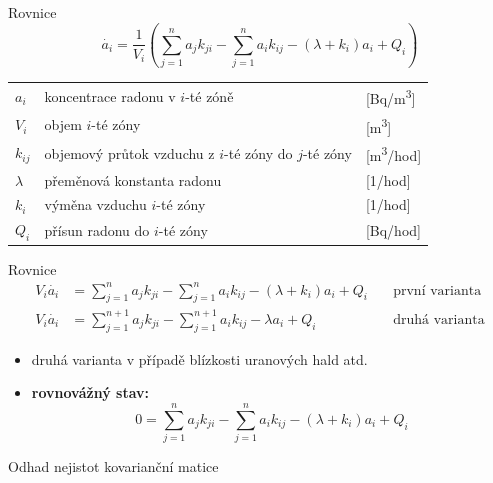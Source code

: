 \documentclass[10pt]{beamer}
\begin{document}
\begin{frame}{Rovnice}
    \small
    \begin{equation}
        \dot{a_i}=\frac{1}{V_i}\left( \sum^n_{j=1}a_j k_{ji}-\sum^n_{j=1}a_i k_{ij}-(\lambda+k_i)a_i+Q_i \right)
        \label{eq:odvozovani}
    \end{equation}
    \begin{table}
        \centering
        \begin{tabular}{lll}
            $a_i$ & koncentrace radonu v $i$-té zóně& [\si{Bq/m^3}] \\
            $V_i$ & objem $i$-té zóny& [\si{m^3}] \\
            $k_{ij}$ & objemový průtok vzduchu z $i$-té zóny do $j$-té zóny& [\si{m^3/hod}]\\
            $\lambda$ & přeměnová konstanta radonu& [\si{1/hod}]\\
            $k_i$ & výměna vzduchu $i$-té zóny& [\si{1/hod}] \\
            $Q_i$ & přísun radonu do $i$-té zóny& [\si{Bq/hod}] \\
        \end{tabular}
    \end{table}
\end{frame}

\begin{frame}{Rovnice}
    \small
    \begin{align}
        V_i\dot{a_i}&=\sum^n_{j=1}a_j k_{ji}-\sum^n_{j=1}a_i k_{ij}-(\lambda+k_i)a_i+Q_i\quad&\text{první varianta}\\
        V_i\dot{a_i}&=\sum^{n+1}_{j=1}a_j k_{ji}-\sum^{n+1}_{j=1}a_i k_{ij}-\lambda a_i+Q_i\quad&\text{druhá varianta}
        \label{eq:rovnice}
    \end{align}
    \begin{itemize}
        \item druhá varianta v případě blízkosti uranových hald atd.
        \item \textbf{rovnovážný stav:}
            \begin{equation}
                0=\sum^n_{j=1}a_j k_{ji}-\sum^n_{j=1}a_i k_{ij}-(\lambda+k_i)a_i+Q_i
            \end{equation}
    \end{itemize}
\end{frame}

\begin{frame}{Odhad nejistot}
    \small
    kovarianční matice
\end{frame}
\end{document}
